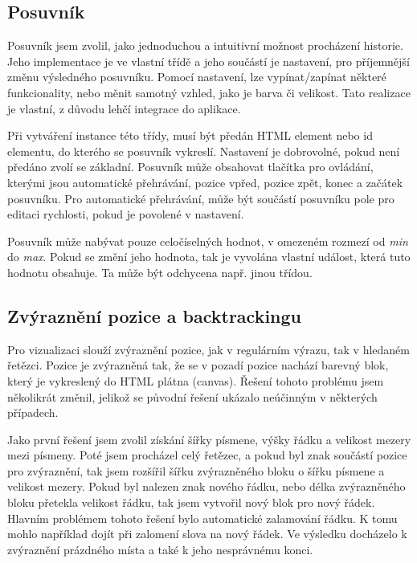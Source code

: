 \subsection*{Posuvník}

Posuvník jsem zvolil, jako jednoduchou a intuitivní možnost procházení historie.
Jeho implementace je ve vlastní třídě a jeho součástí je nastavení, pro příjemnější změnu výsledného posuvníku.
Pomocí nastavení, lze vypínat/zapínat některé funkcionality, nebo měnit samotný vzhled, jako je barva či velikost.
Tato realizace je vlastní, z důvodu lehčí integrace do aplikace.

Při vytváření instance této třídy, musí být předán HTML element nebo id elementu, do kterého se posuvník vykreslí.
Nastavení je dobrovolné, pokud není předáno zvolí se základní.
Posuvník může obsahovat tlačítka pro ovládání, kterými jsou automatické přehrávání, pozice vpřed, pozice zpět, konec a začátek posuvníku.
Pro automatické přehrávání, může být součástí posuvníku pole pro editaci rychlosti, pokud je povolené v nastavení.

Posuvník může nabývat pouze celočíselných hodnot, v omezeném rozmezí od \textit{min} do \textit{max}.
Pokud se změní jeho hodnota, tak je vyvolána vlastní událost, která tuto hodnotu obsahuje.
Ta může být odchycena např. jinou třídou.

\subsection*{Zvýraznění pozice a backtrackingu}

Pro vizualizaci slouží zvýraznění pozice, jak v regulárním výrazu, tak v hledaném řetězci.
Pozice je zvýrazněná tak, že se v pozadí pozice nachází barevný blok, který je vykreslený do HTML plátna (canvas).
Řešení tohoto problému jsem několikrát změnil, jelikož se původní řešení ukázalo neúčinným v některých případech.

Jako první řešení jsem zvolil získání šířky písmene, výšky řádku a velikost mezery mezi písmeny.
Poté jsem procházel celý řetězec, a pokud byl znak součástí pozice pro zvýraznění, tak jsem rozšířil šířku zvýrazněného bloku o šířku písmene a velikost mezery.
Pokud byl nalezen znak nového řádku, nebo délka zvýrazněného bloku přetekla velikost řádku, tak jsem vytvořil nový blok pro nový řádek.
Hlavním problémem tohoto řešení bylo automatické zalamování řádku.
K tomu mohlo například dojít při zalomení slova na nový řádek.
Ve výsledku docházelo k zvýraznění prázdného místa a také k jeho nesprávnému konci.

